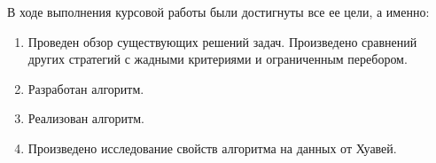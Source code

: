 В ходе выполнения курсовой работы были достигнуты все ее цели, а именно:
\begin{enumerate}
    \item Проведен обзор существующих решений задач. Произведено сравнений других стратегий с жадными критериями и ограниченным перебором.
    \item Разработан алгоритм.
    \item Реализован алгоритм.
    \item Произведено исследование свойств алгоритма на данных от Хуавей.
\end{enumerate}

